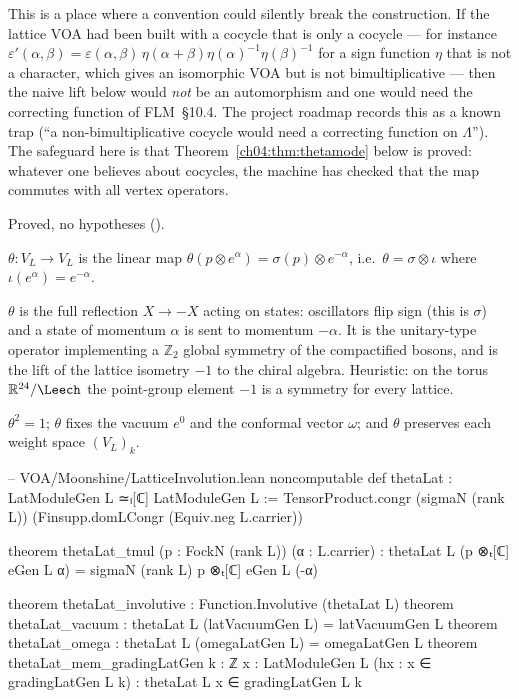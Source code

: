 \begin{warning}
This is a place where a convention could silently break the construction. If the lattice VOA had
been built with a cocycle that is only a cocycle --- for instance
$\varepsilon'(\alpha,\beta)=\varepsilon(\alpha,\beta)\,\eta(\alpha+\beta)\eta(\alpha)^{-1}\eta(\beta)^{-1}$
for a sign function $\eta$ that is not a character, which gives an isomorphic VOA but is not
bimultiplicative --- then the naive lift below would \emph{not} be an automorphism and one would
need the correcting function of FLM~\S10.4. The project roadmap records this as a known trap
(``a non-bimultiplicative cocycle would need a correcting function on $\Lambda$''). The safeguard
here is that Theorem~\ref{ch04:thm:thetamode} below is proved: whatever one believes about
cocycles, the machine has checked that the map commutes with all vertex operators.
\end{warning}

\begin{status}
Proved, no hypotheses ().
\end{status}

\begin{definition}\label{ch04:def:theta}
$\theta:V_L\to V_L$ is the linear map $\theta(p\otimes e^\alpha)=\sigma(p)\otimes e^{-\alpha}$,
i.e.\ $\theta=\sigma\otimes\iota$ where $\iota(e^\alpha)=e^{-\alpha}$.
\end{definition}

\begin{physics}
$\theta$ is the full reflection $X\to-X$ acting on states: oscillators flip sign (this is $\sigma$) and a state of momentum $\alpha$ is sent to momentum $-\alpha$. It is the unitary-type operator implementing a $\mathbb Z_2$ global symmetry of the compactified bosons, and is the lift of the lattice isometry $-1$ to the chiral algebra. Heuristic: on the torus $\mathbb R^{24}/\Leech$ the point-group element $-1$ is a symmetry for every lattice.
\end{physics}

\begin{proposition}\label{ch04:prop:thetabasic}
$\theta^2=1$; $\theta$ fixes the vacuum $e^0$ and the conformal vector $\omega$; and $\theta$
preserves each weight space $(V_L)_k$.
\end{proposition}

\begin{leancode}
-- VOA/Moonshine/LatticeInvolution.lean
noncomputable def thetaLat : LatModuleGen L ≃ₗ[ℂ] LatModuleGen L :=
  TensorProduct.congr (sigmaN (rank L)) (Finsupp.domLCongr (Equiv.neg L.carrier))

theorem thetaLat_tmul (p : FockN (rank L)) (α : L.carrier) :
    thetaLat L (p ⊗ₜ[ℂ] eGen L α) = sigmaN (rank L) p ⊗ₜ[ℂ] eGen L (-α)

theorem thetaLat_involutive : Function.Involutive (thetaLat L)
theorem thetaLat_vacuum : thetaLat L (latVacuumGen L) = latVacuumGen L
theorem thetaLat_omega : thetaLat L (omegaLatGen L) = omegaLatGen L
theorem thetaLat_mem_gradingLatGen {k : ℤ} {x : LatModuleGen L} (hx : x ∈ gradingLatGen L k) :
    thetaLat L x ∈ gradingLatGen L k
\end{leancode}

